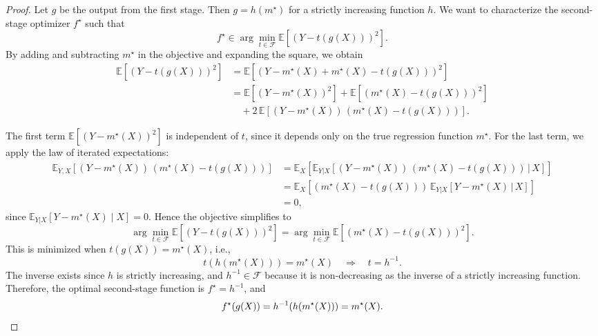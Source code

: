 \documentclass[11pt]{article}
\theoremstyle{plain}
\theoremstyle{plain}
\theoremstyle{plain}
\theoremstyle{plain}
\theoremstyle{plain}
\theoremstyle{plain}
\theoremstyle{plain}
\begin{document}
\begin{proof}
Let $g$ be the output from the first stage. Then $g = h(m^{\star})$ for a strictly increasing function $h$. We want to characterize the second-stage optimizer $f^{\star}$ such that 
\[
f^{\star} \in \arg\min_{t \in \mathcal{F}} \mathbb{E}\left[(Y - t(g(X)))^2\right].
\]
By adding and subtracting $m^\star$ in the objective and expanding the square, we obtain
\begin{align*}
    \mathbb{E}\!\left[(Y - t(g(X)))^2\right]
&= \mathbb{E}\!\left[(Y - m^\star(X) + m^\star(X) - t(g(X)))^2\right] \\
&= \mathbb{E}\!\left[(Y - m^\star(X))^2\right]
   + \mathbb{E}\!\left[(m^\star(X) - t(g(X)))^2\right] \\
&\quad + 2\,\mathbb{E}\!\left[(Y - m^\star(X))\,(m^\star(X) - t(g(X)))\right].
\end{align*}

The first term $\mathbb{E}\!\left[(Y - m^\star(X))^2\right]$ is independent of $t$, since it depends only on the true regression function $m^\star$.  For the last term, we apply the law of iterated expectations:
\[
\begin{aligned}
\mathbb{E}_{Y, X}\!\left[(Y - m^\star(X))\,(m^\star(X) - t(g(X)))\right]
&= \mathbb{E}_X\!\left[\mathbb{E}_{Y|X}\!\left[(Y - m^\star(X))\,(m^\star(X) - t(g(X))) \,|\, X\right]\right] \\
&= \mathbb{E}_X\!\left[(m^\star(X) - t(g(X)))\,\mathbb{E}_{Y|X}\!\left[Y - m^\star(X) \,|\, X\right]\right] \\
&= 0,
\end{aligned}
\]
since $\mathbb{E}_{Y|X}[Y - m^\star(X) \mid X] = 0$. Hence the objective simplifies to
\[
\arg\min_{t \in \mathcal{F}} \mathbb{E}\left[(Y - t(g(X)))^2\right]
= \arg\min_{t \in \mathcal{F}} \mathbb{E}\left[(m^{\star}(X) - t(g(X)))^2\right].
\]
This is minimized when $t(g(X)) = m^{\star}(X)$, i.e.,
\[
t(h(m^{\star}(X))) = m^{\star}(X) \quad\Longrightarrow\quad t = h^{-1}.
\]
The inverse exists since $h$ is strictly increasing, and $h^{-1} \in \mathcal{F}$ because it is non-decreasing as the inverse of a strictly increasing function. Therefore, the optimal second-stage function is $f^{\star} = h^{-1}$, and
\begin{equation*}
    f^{\star}(g(X)) = h^{-1}(h(m^{\star}(X))) = m^{\star}(X). \qedhere
\end{equation*}
\end{proof}
\end{document}
